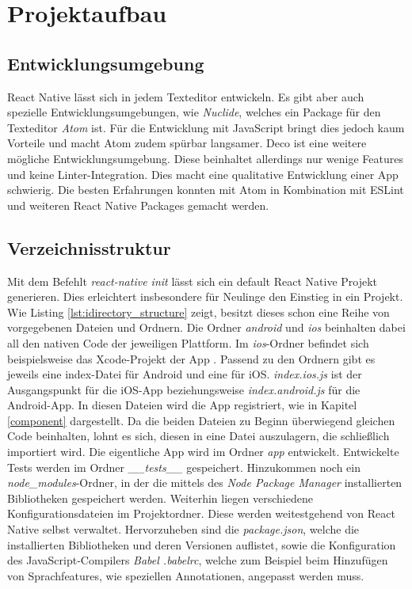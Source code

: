 \section{Projektaufbau}

\subsection{Entwicklungsumgebung}
React Native lässt sich in jedem Texteditor entwickeln. Es gibt aber auch spezielle Entwicklungsumgebungen, wie \textit{Nuclide}, welches ein Package für den Texteditor \textit{Atom} ist. Für die Entwicklung mit JavaScript bringt dies jedoch kaum Vorteile und macht Atom zudem spürbar langsamer. Deco ist eine weitere mögliche Entwicklungsumgebung. Diese beinhaltet allerdings nur wenige Features und keine Linter-Integration. Dies macht eine qualitative Entwicklung einer App schwierig. Die besten Erfahrungen konnten mit Atom in Kombination mit ESLint und weiteren React Native Packages gemacht werden. 

\subsection{Verzeichnisstruktur}
Mit dem Befehlt \textit{react-native init} lässt sich ein default React Native Projekt generieren. Dies erleichtert insbesondere für Neulinge den Einstieg in ein Projekt. Wie Listing \ref{lst:idirectory_structure} zeigt, besitzt dieses schon eine Reihe von vorgegebenen Dateien und Ordnern. Die Ordner \textit{android} und \textit{ios} beinhalten dabei all den nativen Code der jeweiligen Plattform. Im \textit{ios}-Ordner befindet sich beispielsweise das Xcode-Projekt der App \cite{carli_project_2016}. Passend zu den Ordnern gibt es jeweils eine index-Datei für Android und eine für iOS. \textit{index.ios.js} ist der Ausgangspunkt für die iOS-App beziehungsweise \textit{index.android.js} für die Android-App. In diesen Dateien wird die App registriert, wie in Kapitel \ref{component} dargestellt. Da die beiden Dateien zu Beginn überwiegend gleichen Code beinhalten, lohnt es sich, diesen in eine Datei auszulagern, die schließlich importiert wird. Die eigentliche App wird im Ordner \textit{app} entwickelt. Entwickelte Tests werden im Ordner \textit{\_\_tests\_\_} gespeichert. Hinzukommen noch ein \textit{node\_modules}-Ordner, in der die mittels des \textit{Node Package Manager} installierten Bibliotheken gespeichert werden. Weiterhin liegen verschiedene Konfigurationsdateien im Projektordner. Diese werden weitestgehend von React Native selbst verwaltet. Hervorzuheben sind die \textit{package.json}, welche die installierten Bibliotheken und deren Versionen auflistet, sowie die Konfiguration des JavaScript-Compilers \textit{Babel .babelrc}, welche zum Beispiel beim Hinzufügen von Sprachfeatures, wie speziellen Annotationen, angepasst werden muss. 

